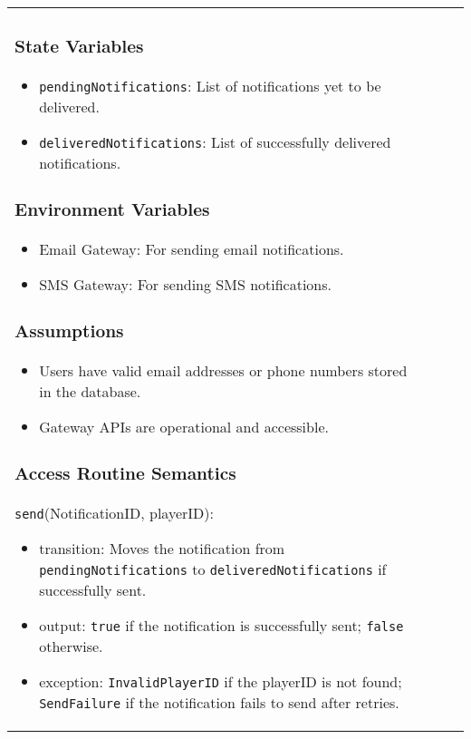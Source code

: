 \documentclass[12pt, titlepage]{article}
\begin{document}
\begin{center}
\begin{tabular}{|p{3cm}|p{4cm}|p{4cm}|p{4cm}|}
\begin{itemize}
\subsubsection{State Variables}

\begin{itemize}
    \item \texttt{pendingNotifications}: List of notifications yet to be delivered.
    \item \texttt{deliveredNotifications}: List of successfully delivered notifications.
\end{itemize}

\subsubsection{Environment Variables}

\begin{itemize}
    \item Email Gateway: For sending email notifications.
    \item SMS Gateway: For sending SMS notifications.
\end{itemize}

\subsubsection{Assumptions}

\begin{itemize}
    \item Users have valid email addresses or phone numbers stored in the database.
    \item Gateway APIs are operational and accessible.
\end{itemize}

\subsubsection{Access Routine Semantics}

\noindent \texttt{send}(NotificationID, playerID):
\begin{itemize}
    \item transition: Moves the notification from \texttt{pendingNotifications} to \texttt{deliveredNotifications} if successfully sent.
    \item output: \texttt{true} if the notification is successfully sent; \texttt{false} otherwise.
    \item exception: \texttt{InvalidPlayerID} if the playerID is not found; \texttt{SendFailure} if the notification fails to send after retries.
\end{itemize}


\end{itemize}
\end{tabular}
\end{center}
\end{document}
